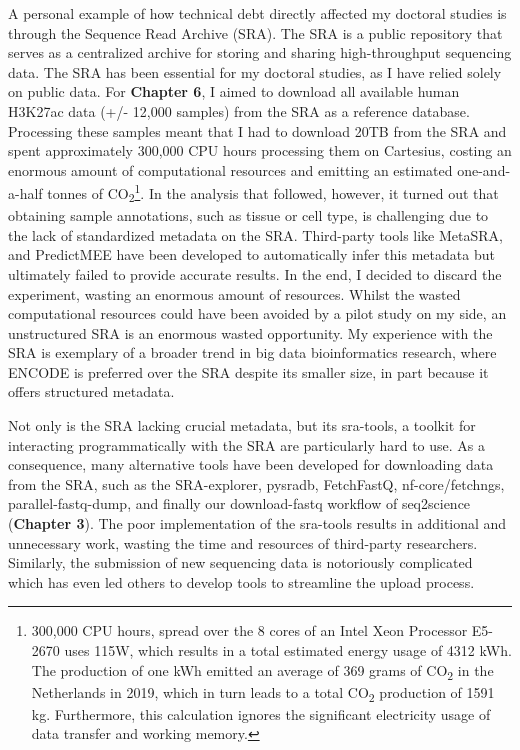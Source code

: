 A personal example of how technical debt directly affected my doctoral studies is through the Sequence Read Archive (SRA). The SRA is a public repository that serves as a centralized archive for storing and sharing high-throughput sequencing data. The SRA has been essential for my doctoral studies, as I have relied solely on public data. For \textbf{Chapter 6}, I aimed to download all available human H3K27ac data (+/- 12,000 samples) from the SRA as a reference database. Processing these samples meant that I had to download 20TB from the SRA and spent approximately 300,000 CPU hours processing them on Cartesius, costing an enormous amount of computational resources and emitting an estimated one-and-a-half tonnes of CO\textsubscript{2}\footnote[2]{300,000 CPU hours, spread over the 8 cores of an Intel Xeon Processor E5-2670 uses 115W\cite{intelIntelXeon}, which results in a total estimated energy usage of 4312 kWh. The production of one kWh emitted an average of 369 grams of CO\textsubscript{2} in the Netherlands in 2019\cite{CO2}, which in turn leads to a total CO\textsubscript{2} production of 1591 kg. Furthermore, this calculation ignores the significant electricity usage of data transfer and working memory.}. In the analysis that followed, however, it turned out that obtaining sample annotations, such as tissue or cell type, is challenging due to the lack of standardized metadata on the SRA. Third-party tools like MetaSRA\cite{Bernstein2017}, and PredictMEE\cite{Klie2021} have been developed to automatically infer this metadata but ultimately failed to provide accurate results. In the end, I decided to discard the experiment, wasting an enormous amount of resources. Whilst the wasted computational resources could have been avoided by a pilot study on my side, an unstructured SRA is an enormous wasted opportunity. My experience with the SRA is exemplary of a broader trend in big data bioinformatics research, where ENCODE is preferred over the SRA despite its smaller size, in part because it offers structured metadata.

Not only is the SRA lacking crucial metadata, but its sra-tools, a toolkit for interacting programmatically with the SRA are particularly hard to use. As a consequence, many alternative tools have been developed for downloading data from the SRA, such as the SRA-explorer\cite{sraexplorer}, pysradb\cite{Choudhary2019}, FetchFastQ\cite{galvez2022metadata}, nf-core/fetchngs\cite{fetchngs}, parallel-fastq-dump\cite{parallelfastq}, and finally our download-fastq workflow of seq2science\cite{seq2science} (\textbf{Chapter 3}). The poor implementation of the sra-tools results in additional and unnecessary work, wasting the time and resources of third-party researchers. Similarly, the submission of new sequencing data is notoriously complicated which has even led others to develop tools to streamline the upload process\cite{Quiones2020}. 

